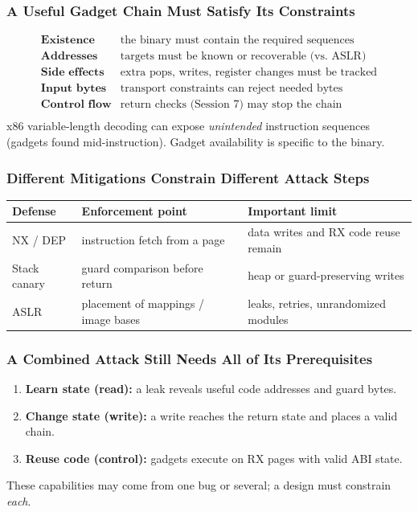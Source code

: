 \documentclass[hidelinks]{article}
\begin{document}
\subsubsection{A Useful Gadget Chain Must Satisfy Its Constraints}

\[
\begin{array}{ll}
\textbf{Existence}    & \text{the binary must contain the required sequences}\\
\textbf{Addresses}    & \text{targets must be known or recoverable (vs.\ ASLR)}\\
\textbf{Side effects} & \text{extra pops, writes, register changes must be tracked}\\
\textbf{Input bytes}  & \text{transport constraints can reject needed bytes}\\
\textbf{Control flow} & \text{return checks (Session 7) may stop the chain}\\
\end{array}
\]
x86 variable-length decoding can expose \emph{unintended} instruction sequences (gadgets found mid-instruction). Gadget availability is specific to the binary.

\subsubsection{Different Mitigations Constrain Different Attack Steps}

\begin{center}
\color{white}
\begin{tabular}{p{2.8cm}p{4.9cm}p{4.9cm}}
\hline
\textbf{Defense} & \textbf{Enforcement point} & \textbf{Important limit}\\ \hline
NX / DEP & instruction fetch from a page & data writes and RX code reuse remain\\
Stack canary & guard comparison before return & heap or guard-preserving writes\\
ASLR & placement of mappings / image bases & leaks, retries, unrandomized modules\\ \hline
\end{tabular}
\end{center}

\subsubsection{A Combined Attack Still Needs All of Its Prerequisites}

\begin{enumerate}
    \item \textbf{Learn state (read):} a leak reveals useful code addresses and guard bytes.
    \item \textbf{Change state (write):} a write reaches the return state and places a valid chain.
    \item \textbf{Reuse code (control):} gadgets execute on RX pages with valid ABI state.
\end{enumerate}
These capabilities may come from one bug or several; a design must constrain \emph{each}.
\end{document}
